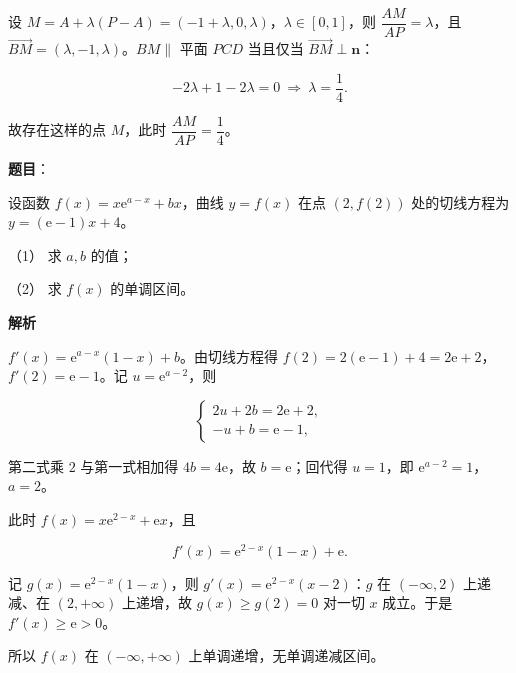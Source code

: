 \begin{answer}
设 \(M=A+\lambda(P-A)=(-1+\lambda,0,\lambda)\)，\(\lambda\in[0,1]\)，则 \(\dfrac{AM}{AP}=\lambda\)，且 \(\overrightarrow{BM}=(\lambda,-1,\lambda)\)。\(BM\parallel\) 平面 \(PCD\) 当且仅当 \(\overrightarrow{BM}\perp\boldsymbol n\)：

\nopagebreak[4]
\[
-2\lambda+1-2\lambda=0\ \Longrightarrow\ \lambda=\frac14 .
\]

故存在这样的点 \(M\)，此时 \(\dfrac{AM}{AP}=\dfrac14\)。




\end{answer}
\begin{answer}

\textbf{题目}：

设函数 \(f(x)=x\mathrm{e}^{a-x}+bx\)，曲线 \(y=f(x)\) 在点 \((2,f(2))\) 处的切线方程为 \(y=(\mathrm{e}-1)x+4\)。

（1） 求 \(a,b\) 的值；

（2） 求 \(f(x)\) 的单调区间。

\textbf{解析}


\(f'(x)=\mathrm e^{a-x}(1-x)+b\)。由切线方程得 \(f(2)=2(\mathrm e-1)+4=2\mathrm e+2\)，\(f'(2)=\mathrm e-1\)。记 \(u=\mathrm e^{a-2}\)，则

\nopagebreak[4]
\[
\begin{cases}
2u+2b=2\mathrm e+2,\\
-u+b=\mathrm e-1,
\end{cases}
\]

第二式乘 \(2\) 与第一式相加得 \(4b=4\mathrm e\)，故 \(b=\mathrm e\)；回代得 \(u=1\)，即 \(\mathrm e^{a-2}=1\)，\(a=2\)。


此时 \(f(x)=x\mathrm e^{2-x}+\mathrm e x\)，且

\nopagebreak[4]
\[
f'(x)=\mathrm e^{2-x}(1-x)+\mathrm e .
\]

记 \(g(x)=\mathrm e^{2-x}(1-x)\)，则 \(g'(x)=\mathrm e^{2-x}(x-2)\)：\(g\) 在 \((-\infty,2)\) 上递减、在 \((2,+\infty)\) 上递增，故 \(g(x)\geqslant g(2)=0\) 对一切 \(x\) 成立。于是 \(f'(x)\geqslant\mathrm e>0\)。

所以 \(f(x)\) 在 \((-\infty,+\infty)\) 上单调递增，无单调递减区间。



\end{answer}
